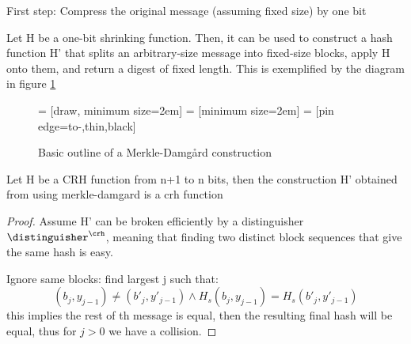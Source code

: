 First step: Compress the original message (assuming fixed size) by one bit

Let H be a one-bit shrinking function. Then, it can be used to construct a hash function H' that splits an arbitrary-size message into fixed-size blocks, apply H onto them, and return a digest of fixed length. This is exemplified by the diagram in figure \ref{fig:mdbase}

\begin{figure}
    \centering

       = [draw, minimum size=2em]
     = [minimum size=2em]
      = [pin edge={to-,thin,black}]

    \caption{Basic outline of a Merkle-Damg\r{a}rd construction}
    \label{fig:mdbase}
\end{figure}


\begin{theorem}
    Let H be a CRH function from n+1 to n bits, then the construction H' obtained from using merkle-damgard is a crh function
\end{theorem}

\begin{proof}
    Assume H' can be broken efficiently by a distinguisher $\distinguisher^{\crh}$, meaning that finding two distinct block sequences that give the same hash is easy.

    Ignore same blocks: find largest j such that:
    \[
        (b_j, y_{j-1}) \neq (b'_j, y'_{j-1}) \wedge H_s(b_j, y_{j-1}) = H_s(b'_j, y'_{j-1})
    \]
    this implies the rest of th message is equal, then the resulting final hash will be equal, thus for $j>0$ we have a collision.


\end{proof}

